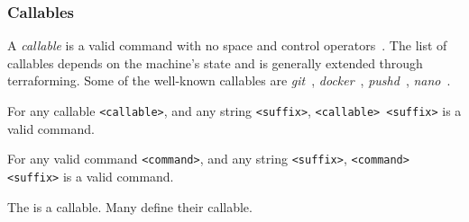 \subsubsection{Callables}\label{callables}

A \emph{callable} is a valid command with no space and control operators~. The list of callables depends on the machine's state and is generally extended through terraforming. Some of the well-known callables are \emph{git}~, \emph{docker}~, \emph{pushd}~, \emph{nano}~. 

\begin{theorem}
For any callable \texttt{<callable>}, and any string \texttt{<suffix>}, \texttt{<callable> <suffix>} is a valid command.
\end{theorem}

\begin{theorem}
For any valid command \texttt{<command>}, and any string \texttt{<suffix>}, \texttt{<command> <suffix>} is a valid command.
\end{theorem}

The  is a callable. Many  define their callable. 